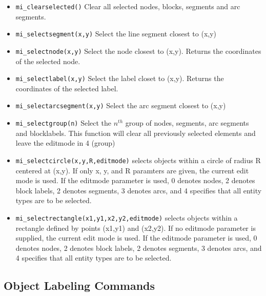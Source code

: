 \begin{itemize}
\item{\tt mi\_clearselected()} Clear all selected nodes, blocks, segments
and arc segments.

\item{\tt mi\_selectsegment(x,y)} Select the line segment closest to
(x,y)

\item{\tt mi\_selectnode(x,y)} Select the node closest to (x,y).
Returns the coordinates of the selected node.

\item{\tt mi\_selectlabel(x,y)} Select the label closet to (x,y).
Returns the coordinates of the selected label.

\item{\tt mi\_selectarcsegment(x,y)} Select the arc segment closest to
(x,y)

\item{\tt mi\_selectgroup(n)} Select the $n^{th}$ group of nodes, segments, arc
segments and blocklabels. This function will clear all previously selected
elements and leave the editmode in 4 (group)

\item{\tt mi\_selectcircle(x,y,R,editmode)} selects objects within a circle of radius
R centered at (x,y).  If only x, y, and R paramters are given, the current
edit mode is used.  If the editmode parameter is used, 0 denotes nodes, 2
denotes block labels, 2 denotes segments, 3 denotes arcs, and 4 specifies
that all entity types are to be selected.

\item{\tt mi\_selectrectangle(x1,y1,x2,y2,editmode)} selects objects within a rectangle
defined by points (x1,y1) and (x2,y2). If no editmode parameter is supplied,
the current edit mode is used.  If the editmode parameter is used, 0 denotes
nodes, 2 denotes block labels, 2 denotes segments, 3 denotes arcs, and 4 
specifies that all entity types are to be selected.

\end{itemize}

\subsection{Object Labeling Commands}

